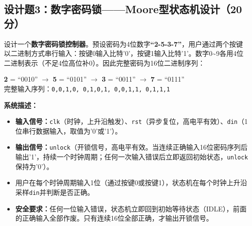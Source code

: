 \newpage

\subsection*{设计题3：数字密码锁——Moore型状态机设计（20分）}

设计一个\textbf{数字密码锁控制器}。预设密码为4位数字\textbf{``2-5-3-7''}，用户通过两个按键以二进制方式串行输入：按键0输入比特'0'，按键1输入比特'1'。数字0\~{}9各用4位二进制表示（不足4位高位补0）。因此完整密码为16位二进制序列：

{\centering
\textbf{2} = ``0010'' $\rightarrow$ \textbf{5} = ``0101'' $\rightarrow$ \textbf{3} = ``0011'' $\rightarrow$ \textbf{7} = ``0111''\\[2pt]
完整输入序列：\texttt{0,0,1,0, 0,1,0,1, 0,0,1,1, 0,1,1,1}
\par}

\vspace{0.3cm}

\textbf{系统描述：}
\begin{itemize}
  \item \textbf{输入信号：}\texttt{clk}（时钟，上升沿触发）、\texttt{rst}（异步复位，高电平有效）、\texttt{din}（1位串行数据输入，取值为'0'或'1'）。
  \item \textbf{输出信号：}\texttt{unlock}（开锁信号，高电平有效。当连续正确输入16位密码序列后输出'1'，持续一个时钟周期；任何一次输入错误后立即返回初始状态，\texttt{unlock}保持为'0'）。
  \item 用户在每个时钟周期输入1位（通过按键0或按键1），状态机在每个时钟上升沿采样\texttt{din}并判断是否正确。
  \item \textbf{安全要求：}任何一位输入错误，状态机立即回到初始等待状态（IDLE），前面的正确输入全部作废。只有连续16位全部正确，才输出开锁信号。
\end{itemize}

\vspace{0.3cm}

